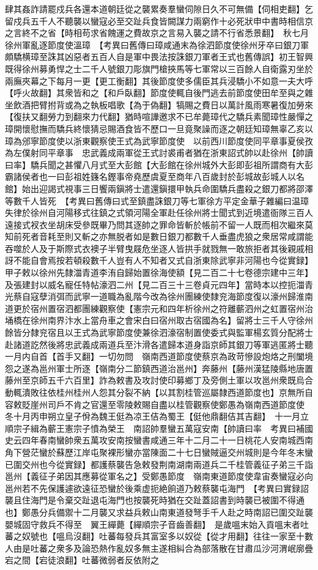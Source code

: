 肆其姦詐請罷戍兵各還本道朝廷從之襲累奏羣蠻伺隙日久不可無備【伺相吏翻】乞留戍兵五千人不聽襲以蠻寇必至交趾兵食皆闕謀力兩窮作十必死狀申中書時相信京之言終不之省【時相苟求省餽運之費故京之言易入襲之請不行省悉景翻】　秋七月徐州軍亂逐節度使溫璋　【考異曰舊傳曰璋咸通末為徐泗節度使徐州牙卒曰銀刀軍頗驕横璋至誅其凶惡者五百人自是軍中畏法按誅銀刀軍者王式也舊傳誤】初王智興既得徐州募勇悍之士二千人號銀刀彫旗門槍挾馬等七軍常以三百餘人自衛露刃坐於兩廡夾幕之下每月一更【更工衡翻】其後節度使多儒臣其兵浸驕小不如意一夫大呼【呼火故翻】其衆皆和之【和戶臥翻】節度使輒自後門逃去前節度使田牟至與之雜坐飲酒把臂拊背或為之執板唱歌【為于偽翻】犒賜之費日以萬計風雨寒暑復加勞來【復扶又翻勞力到翻來力代翻】猶時喧譁邀求不已牟薨璋代之驕兵素聞璋性嚴憚之璋開懷慰撫而驕兵終懷猜忌賜酒食皆不歷口一旦竟聚譟而逐之朝廷知璋無辜乙亥以璋為邠寧節度使以浙東觀察使王式為武寧節度使　以前西川節度使同平章事夏侯孜為左僕射同平章事　忠武義成兩軍從王式討裘甫者猶在浙東詔式帥以赴徐州【帥讀曰率】驕兵聞之甚懼八月式至大彭館【大彭館在徐州城外大彭即彭祖所謂商有大彭霸諸侯者也一曰彭祖姓籛名鏗事帝堯歷虞夏至商年八百歲封於彭城故彭城人以名館】始出迎謁式視事三日饗兩鎭將士遣還鎭擐甲執兵命圍驕兵盡殺之銀刀都將邵澤等數千人皆死　【考異曰舊傳曰式至鎮盡誅銀刀等七軍徐方平定金華子雜編曰温璋失律於徐州自河陽移式往鎮之式領河陽全軍赴任徐州將士聞式到近境遣衙隊三百人遠接式衩衣坐胡床受參既畢乃問其逐帥之罪命皆斬於帳前不留一人既而相次繼來莫知前死者音耗至則又斬之亦無脱者如是數日銀刀都數千人垂盡虎狼之衆居常咸謂能吞噬於人及于斯際式衣襖子半臂曳屐危坐逐人皆拱手就戮無一敢旅拒者其後親戚相訝不能自會焉按若頓殺數千人豈有人不知者又式自浙東除武寧非河陽也今從實録】甲子敕以徐州先隸湽青道李洧自歸始置徐海使額【見二百二十七卷德宗建中三年】及張建封以威名寵任特帖濠泗二州【見二百三十三卷貞元四年】當時本以控扼湽青光蔡自寇孽消弭而武寧一道職為亂階今改為徐州團練使隸兖海節度復以濠州歸淮南道更於宿州置宿泗都團練觀察使【憲宗元和四年析徐州之符離蘄泗州之虹置宿州治埇橋在徐州南界汴水上當舟車之會宋白曰宿州取古宿國為名】留將士三千人守徐州餘皆分隸兖宿且以王式為武寧節度使兼徐泗濠宿制置使委式與監軍楊玄質分配將士赴諸道訖然後將忠武義成兩道兵至汴滑各遣歸本道身詣京師其銀刀等軍逃匿將士聽一月内自首【首手又翻】一切勿問　嶺南西道節度使蔡京為政苛慘設炮烙之刑闔境怨之遂為邕州軍士所逐【嶺南分二節鎮西道治邕州】奔藤州【藤州漢猛陵縣地唐置藤州至京師五千六百里】詐為敕書及攻討使印募鄉丁及旁側土軍以攻邕州衆既烏合動輒潰敗往依桂州桂州人怨其分裂不納【以其割桂管巡屬隸西道節度也】京無所自容敕貶崖州司戶不肯之官還至零陵敕賜自盡以桂管觀察使鄭愚為嶺南西道節度使　冬十月丙申朔立皇子佾為魏王侹為凉王佶為蜀王【侹他鼎翻佶其吉翻】　十一月立順宗子緝為蘄王憲宗子憤為榮王　南詔帥羣蠻五萬寇安南【帥讀曰率　考異曰補國史云四年春南蠻帥衆五萬攻安南按蠻書咸通三年十二月二十一日桃花人安南城西南角下營茫蠻於蘇歷江岸屯聚裸形蠻亦當陳面二十七日蠻賊逼交州城則是今年冬末蠻已圍交州也今從實録】都護蔡襲告急敕發荆南湖南兩道兵二千桂管義征子弟三千詣邕州【義征子弟因其應募從軍名之】受鄭愚節度　嶺南東道節度使韋宙奏蠻寇必向邕州若不先保護遽欲遠征恐蠻於後乘虚扼絶餉道乃敕蔡襲屯海門　【考異曰實録詔襲且住海門是令棄交趾退屯海門也按襲死時猶在交趾蓋詔書到時襲已被圍不得通也】鄭愚分兵備禦十二月襲又求益兵敕山南東道發弩手千人赴之時南詔已圍交趾襲嬰城固守救兵不得至　翼王繟薨【繟順宗子音齒善翻】　是歲嗢末始入貢嗢末者吐蕃之奴號也【嗢烏沒翻】吐蕃每發兵其富室多以奴從【從才用翻】往往一家至十數人由是吐蕃之衆多及論恐熱作亂奴多無主遂相糾合為部落散在甘肅瓜沙河渭岷廓疊宕之間【宕徒浪翻】吐蕃微弱者反依附之

